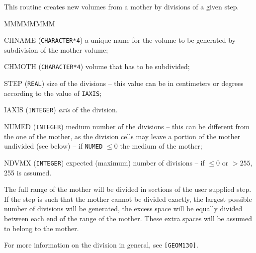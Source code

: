        

This routine creates new volumes from a mother 
by divisions of a given step.


\begin{DLtt}{MMMMMMMM}
\item[CHNAME] ({\tt CHARACTER*4}) a unique name for the volume to be generated
by subdivision of the mother volume;
\item[CHMOTH] ({\tt CHARACTER*4}) volume that has to be subdivided;
\item[STEP] ({\tt REAL}) size of the divisions -- this value can be in 
centimeters or degrees according to the value of {\tt IAXIS};
\item[IAXIS] ({\tt INTEGER}) {\it axis} of the division.
\item[NUMED] ({\tt INTEGER}) medium number of the divisions -- this can be 
different from the one of the mother, as the division cells may leave a
portion of the mother undivided (see below) --
if {\tt NUMED} $\leq 0$  the medium of the mother;
\item[NDVMX] ({\tt INTEGER}) expected (maximum) number of divisions -- if
$ \leq 0 $ or $ > 255 $, 255 is assumed.
\end{DLtt}

The full range of the mother will be divided
in sections of the user supplied step. If the step is such that the mother
cannot be divided exactly, the largest possible number
of divisions will be generated, the excess space will be equally
divided between each end of the range of the mother. These extra
spaces will be assumed to belong to the mother.

For more information on the division in general, see {\tt [GEOM130]}.
